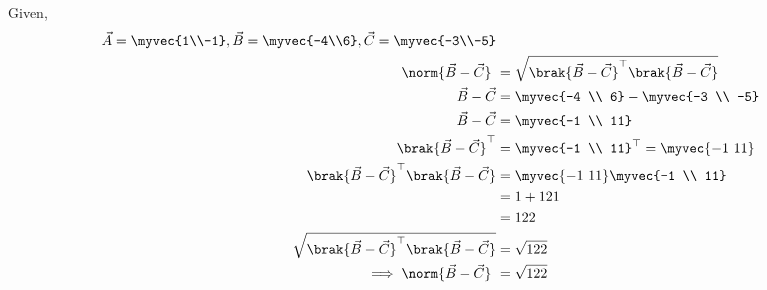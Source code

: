 \solution
Given, 
\begin{align}
\vec{A} = \myvec{1\\-1},
\vec{B} = \myvec{-4\\6},
\vec{C} = \myvec{-3\\-5} \\  
 \norm{\vec{B}-\vec{C}}\ &=  \sqrt{\brak{\vec{B}-\vec{C}}^{\top}\brak{\vec{B}-\vec{C}}} \\
 \vec{B}-\vec{C} &= \myvec{-4 \\ 6} - \myvec{-3 \\ -5} \\
 \vec{B}-\vec{C} &= \myvec{-1 \\ 11} \\
 \brak{\vec{B}-\vec{C}}^{\top} &= {\myvec{-1 \\ 11}}^{\top} = \myvec{-1 \ 11} \\
\brak{\vec{B}-\vec{C}}^{\top}\brak{\vec{B}-\vec{C}} &= \myvec{-1 \ 11} \myvec{-1 \\ 11}\\
             &= 1+121 \\
             &= 122 \\  
 \sqrt{\brak{\vec{B}-\vec{C}}^{\top}\brak{\vec{B}-\vec{C}}} &= \sqrt{122}	\\
\implies \norm{\vec{B}-\vec{C}}\ &= \sqrt{122} 
\end{align}
